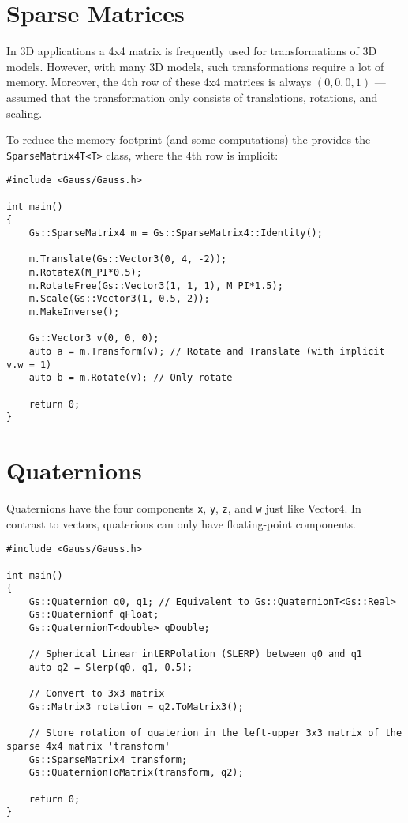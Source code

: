 \documentclass{article}
\begin{document}

\section*{Sparse Matrices}
\label{sec:sparse_matrices}

In 3D applications a 4x4 matrix is frequently used for transformations of 3D models.
However, with many 3D models, such transformations require a lot of memory.
Moreover, the 4th row of these 4x4 matrices is always $(0, 0, 0, 1)$ --- assumed that the transformation
only consists of translations, rotations, and scaling.

To reduce the memory footprint (and some computations) the \gausslib provides the \texttt{SparseMatrix4T<T>} class,
where the 4th row is implicit:
\begin{lstlisting}
#include <Gauss/Gauss.h>

int main()
{
	Gs::SparseMatrix4 m = Gs::SparseMatrix4::Identity();
	
	m.Translate(Gs::Vector3(0, 4, -2));
	m.RotateX(M_PI*0.5);
	m.RotateFree(Gs::Vector3(1, 1, 1), M_PI*1.5);
	m.Scale(Gs::Vector3(1, 0.5, 2));
	m.MakeInverse();
	
	Gs::Vector3 v(0, 0, 0);
	auto a = m.Transform(v); // Rotate and Translate (with implicit v.w = 1)
	auto b = m.Rotate(v); // Only rotate
	
	return 0;
}
\end{lstlisting}



\section*{Quaternions}

Quaternions have the four components \texttt{x}, \texttt{y}, \texttt{z}, and \texttt{w} just like Vector4.
In contrast to vectors, quaterions can only have floating-point components.
\begin{lstlisting}
#include <Gauss/Gauss.h>

int main()
{
	Gs::Quaternion q0, q1; // Equivalent to Gs::QuaternionT<Gs::Real>
	Gs::Quaternionf qFloat;
	Gs::QuaternionT<double> qDouble;
	
	// Spherical Linear intERPolation (SLERP) between q0 and q1
	auto q2 = Slerp(q0, q1, 0.5);
	
	// Convert to 3x3 matrix
	Gs::Matrix3 rotation = q2.ToMatrix3();
	
	// Store rotation of quaterion in the left-upper 3x3 matrix of the sparse 4x4 matrix 'transform'
	Gs::SparseMatrix4 transform;
	Gs::QuaternionToMatrix(transform, q2);
	
	return 0;
}
\end{lstlisting}
\end{document}
